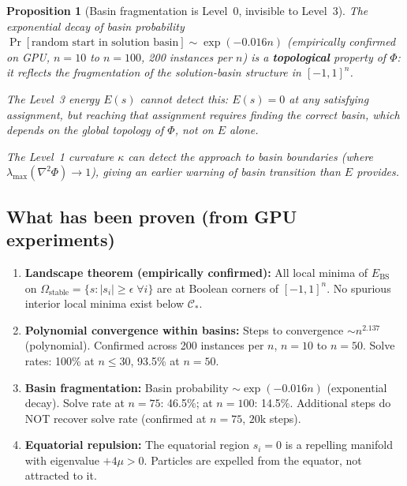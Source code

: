 \documentclass[11pt,a4paper]{article}
\newtheorem{proposition}[theorem]{Proposition}
\theoremstyle{definition}
\begin{document}
\begin{proposition}[Basin fragmentation is Level~0, invisible to Level~3]
The exponential decay of basin probability
$\Pr[\text{random start in solution basin}] \sim \exp(-0.016n)$
(empirically confirmed on GPU, $n=10$ to $n=100$, 200 instances per $n$)
is a \textbf{topological} property of $\Phi$: it reflects the fragmentation
of the solution-basin structure in $[-1,1]^n$.

The Level~3 energy $E(s)$ cannot detect this: $E(s)=0$ at any satisfying
assignment, but reaching that assignment requires finding the correct basin,
which depends on the global topology of $\Phi$, not on $E$ alone.

The Level~1 curvature $\kappa$ can detect the approach to basin boundaries
(where $\lambda_\mathrm{max}(\nabla^2\Phi)\to 1$), giving an earlier warning
of basin transition than $E$ provides.
\end{proposition}

\subsection{What has been proven (from GPU experiments)}

\begin{enumerate}
\item \textbf{Landscape theorem (empirically confirmed):}
  All local minima of $E_\mathrm{BS}$ on $\Omega_\mathrm{stable}
  = \{s : |s_i|\geq\epsilon\;\forall i\}$
  are at Boolean corners of $[-1,1]^n$. No spurious interior local minima
  exist below $\mathcal{C}_*$.

\item \textbf{Polynomial convergence within basins:}
  Steps to convergence $\sim n^{2.137}$ (polynomial).
  Confirmed across 200 instances per $n$, $n=10$ to $n=50$.
  Solve rates: 100\% at $n\leq 30$, 93.5\% at $n=50$.

\item \textbf{Basin fragmentation:}
  Basin probability $\sim\exp(-0.016n)$ (exponential decay).
  Solve rate at $n=75$: 46.5\%; at $n=100$: 14.5\%.
  Additional steps do NOT recover solve rate (confirmed at $n=75$, $20$k steps).

\item \textbf{Equatorial repulsion:}
  The equatorial region $s_i=0$ is a repelling manifold with eigenvalue $+4\mu>0$.
  Particles are expelled from the equator, not attracted to it.
\end{enumerate}
\end{document}
